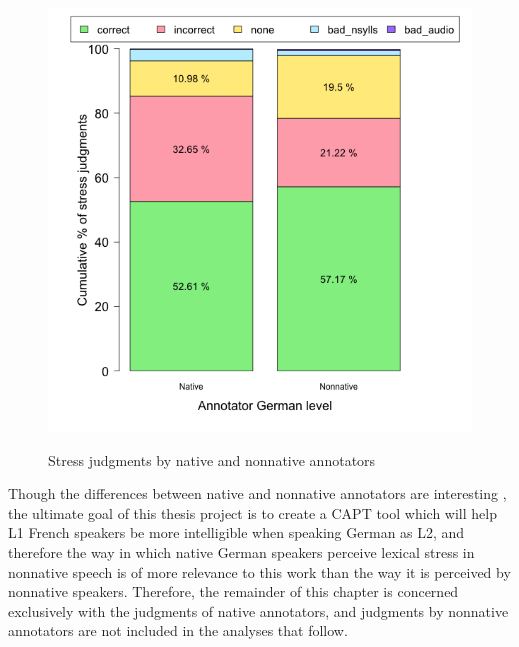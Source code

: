 			\begin{figure}[htb]
				\centering
				\caption{Stress judgments by native and nonnative annotators}
				\includegraphics[width=.9\textwidth]{img/plots/pctJudgmentsByL1-NoTitle}
				\label{fig:agreement:l1bars}
			\end{figure}
	
			
		Though the differences between native and nonnative annotators are interesting , the ultimate goal of this thesis project is to create a CAPT tool which will help L1 French speakers be more intelligible when speaking German as L2, and therefore the way in which native German speakers perceive lexical stress in nonnative speech is of more relevance to this work than the way it is perceived by nonnative speakers. Therefore, the remainder of this chapter is concerned exclusively with the judgments of native annotators, and judgments by nonnative annotators are not included in the analyses that follow.
			

